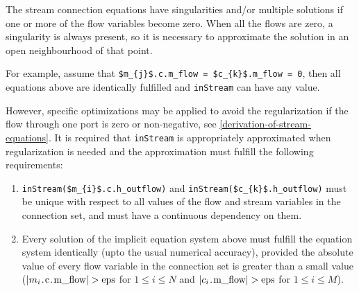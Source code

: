 The stream connection equations have singularities and/or multiple solutions if one or more of the flow variables become zero.
When all the flows are zero, a singularity is always present, so it is necessary to approximate the solution in an open neighbourhood of that point.

\begin{nonnormative}
For example, assume that \lstinline!$m_{j}$.c.m_flow = $c_{k}$.m_flow = 0!, then all equations above are identically fulfilled and \lstinline!inStream! can have any value.
\end{nonnormative}

However, specific optimizations may be applied to avoid the regularization if the flow through one port is zero or non-negative, see \cref{derivation-of-stream-equations}.
It is required that \lstinline!inStream! is appropriately approximated when regularization is needed and the approximation must fulfill the following requirements:
\begin{enumerate}
\item
  \lstinline!inStream($m_{i}$.c.h_outflow)! and \lstinline!inStream($c_{k}$.h_outflow)! must be unique with respect to all values of the flow and stream variables in the connection set, and must have a continuous dependency on them.
\item
  Every solution of the implicit equation system above must fulfill the equation system identically (upto the usual numerical accuracy), provided the absolute value of every flow variable in the connection set is greater than a small value ($\abs{m_{i}\text{\lstinline!.c.m_flow!}} > \text{\lstinline!eps!}$ for $1 \leq i \leq N$ and $\abs{c_{i}\text{\lstinline!.m_flow!}} > \text{\lstinline!eps!}$ for $1 \leq i \leq M$).
\end{enumerate}

